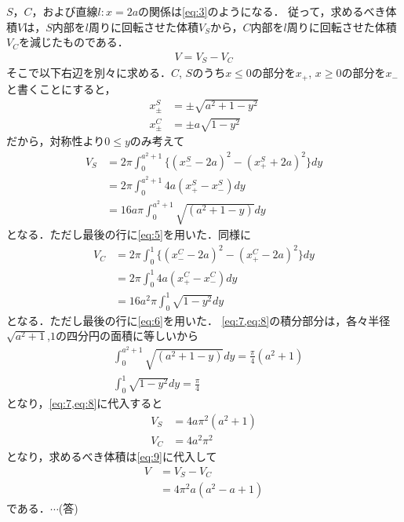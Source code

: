 \documentclass[a4paper,10pt]{ltjsarticle}
\begin{document}
\begin{multicols}{2}
  $S$，$C$，および直線$l:x=2a$の関係は\cref{eq:3}のようになる．
  従って，求めるべき体積$V$は，$S$内部を$l$周りに回転させた体積$V_S$から，$C$内部を$l$周りに回転させた体積$V_C$を減じたものである．
  \begin{align}
    V = V_S - V_C\label{eq:9}
  \end{align}
  そこで以下右辺を別々に求める．$C$, $S$のうち$x\le 0$の部分を$x_{+}$, $x\ge 0$の部分を$x_{-}$と書くことにすると，
  \begin{align}
    x^{S}_{\pm} & = \pm \sqrt{a^2+1-y^2} \label{eq:5} \\
    x^{C}_{\pm} & = \pm a\sqrt{1-y^2} \label{eq:6}
  \end{align}
  だから，対称性より$0\le y$のみ考えて
  \begin{align}
    V_S
     & = 2\pi \int_{0}^{a^2+1} \{(x^{S}_{-} - 2a)^2 - (x^{S}_{+} + 2a)^2\} dy \nonumber \\
     & = 2\pi \int_{0}^{a^2+1} 4a(x^{S}_{+} - x^{S}_{-}) dy \nonumber                   \\
     & = 16a\pi \int_{0}^{a^2+1} \sqrt{(a^2+1-y)} dy \label{eq:7}
  \end{align}
  となる．ただし最後の行に\cref{eq:5}を用いた．同様に
  \begin{align}
    V_C
     & = 2\pi \int_{0}^{1} \{(x^{C}_{-} - 2a)^2 - (x^{C}_{+} - 2a)^2\} dy \nonumber \\
     & = 2\pi \int_{0}^{1} 4a(x^{C}_{+} - x^{C}_{-}) dy \nonumber                   \\
     & = 16a^2\pi \int_{0}^{1} \sqrt{1-y^2} dy \label{eq:8}
  \end{align}
  となる．ただし最後の行に\cref{eq:6}を用いた．
  \cref{eq:7,eq:8}の積分部分は，各々半径$\sqrt{a^2+1}$,$1$の四分円の面積に等しいから
  \begin{align}
     & \int_{0}^{a^2+1} \sqrt{(a^2+1-y)} dy = \frac{\pi}{4}(a^2+1) \\
     & \int_{0}^{1} \sqrt{1-y^2} dy = \frac{\pi}{4}
  \end{align}
  となり，\cref{eq:7,eq:8}に代入すると
  \begin{align}
    V_S & = 4a\pi^2 (a^2+1) \\
    V_C & = 4a^2\pi^2
  \end{align}
  となり，求めるべき体積は\cref{eq:9}に代入して
  \begin{align}
    V
     & = V_S - V_C         \\
     & = 4\pi^2a (a^2-a+1)
  \end{align}
  である．$\cdots$(答)



\end{multicols}
\end{document}
